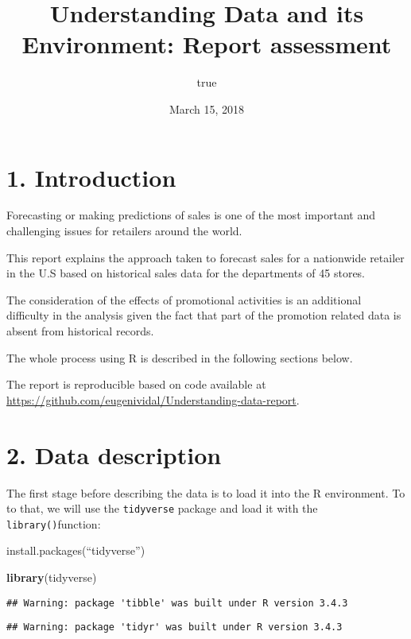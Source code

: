 \documentclass[11pt,]{article}
\title{Understanding Data and its Environment: Report assessment}
\author{true}
\date{March 15, 2018}
\newenvironment{Shaded}{\begin{snugshade}}{\end{snugshade}}
\newcommand{\KeywordTok}[1]{\textcolor[rgb]{0.13,0.29,0.53}{\textbf{{#1}}}}
\newcommand{\NormalTok}[1]{{#1}}
\begin{document}
\maketitle

\section{1. Introduction}\label{introduction}

Forecasting or making predictions of sales is one of the most important
and challenging issues for retailers around the
world\citep{reference_needed}.

This report explains the approach taken to forecast sales for a
nationwide retailer in the U.S based on historical sales data for the
departments of 45 stores.

The consideration of the effects of promotional activities is an
additional difficulty in the analysis given the fact that part of the
promotion related data is absent from historical records.

The whole process using R is described in the following sections below.

The report is reproducible based on code available at
\url{https://github.com/eugenividal/Understanding-data-report}.

\section{2. Data description}\label{data-description}

The first stage before describing the data is to load it into the R
environment. To to that, we will use the \texttt{tidyverse} package and
load it with the \texttt{library()}function:

install.packages(``tidyverse'')

\begin{Shaded}
\begin{Highlighting}[]
\KeywordTok{library}\NormalTok{(tidyverse)}
\end{Highlighting}
\end{Shaded}

\begin{verbatim}
## Warning: package 'tibble' was built under R version 3.4.3
\end{verbatim}

\begin{verbatim}
## Warning: package 'tidyr' was built under R version 3.4.3
\end{verbatim}
\end{document}
